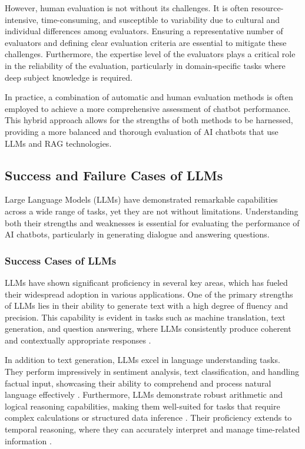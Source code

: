 However, human evaluation is not without its challenges. It is often resource-intensive, time-consuming, and susceptible to variability due to cultural and individual differences among evaluators. Ensuring a representative number of evaluators and defining clear evaluation criteria are essential to mitigate these challenges. Furthermore, the expertise level of the evaluators plays a critical role in the reliability of the evaluation, particularly in domain-specific tasks where deep subject knowledge is required.

In practice, a combination of automatic and human evaluation methods is often employed to achieve a more comprehensive assessment of chatbot performance. This hybrid approach allows for the strengths of both methods to be harnessed, providing a more balanced and thorough evaluation of AI chatbots that use LLMs and RAG technologies.

\subsection{Success and Failure Cases of LLMs}

Large Language Models (LLMs) have demonstrated remarkable capabilities across a wide range of tasks, yet they are not without limitations. Understanding both their strengths and weaknesses is essential for evaluating the performance of AI chatbots, particularly in generating dialogue and answering questions.

\subsubsection{Success Cases of LLMs}

LLMs have shown significant proficiency in several key areas, which has fueled their widespread adoption in various applications. One of the primary strengths of LLMs lies in their ability to generate text with a high degree of fluency and precision. This capability is evident in tasks such as machine translation, text generation, and question answering, where LLMs consistently produce coherent and contextually appropriate responses  .

In addition to text generation, LLMs excel in language understanding tasks. They perform impressively in sentiment analysis, text classification, and handling factual input, showcasing their ability to comprehend and process natural language effectively  . Furthermore, LLMs demonstrate robust arithmetic and logical reasoning capabilities, making them well-suited for tasks that require complex calculations or structured data inference  . Their proficiency extends to temporal reasoning, where they can accurately interpret and manage time-related information .

